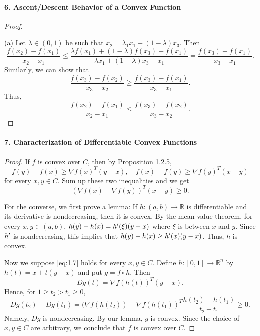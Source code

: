   \paragraph{6. Ascent/Descent Behavior of a Convex Function}
  \begin{proof}
    $\,$\par
    (a) Let $\lambda\in(0,1)$ be such that $x_2=\lambda_1x_1+(1-\lambda)x_3$.
    Then
    \[
      \frac{f(x_2)-f(x_1)}{x_2-x_1}
      \le\frac{\lambda f(x_1)+(1-\lambda)f(x_3)-f(x_1)}
         {\lambda x_1+(1-\lambda)x_3-x_1}
      =\frac{f(x_3)-f(x_1)}{x_3-x_1}.
    \]
    Similarly, we can show that
    \[
      \frac{f(x_3)-f(x_2)}{x_3-x_2}\ge\frac{f(x_3)-f(x_1)}{x_3-x_1}.
    \]
    Thus, 
    \[
      \frac{f(x_2)-f(x_1)}{x_2-x_1}\le\frac{f(x_3)-f(x_2)}{x_3-x_2}.
    \]
  \end{proof}
  
  \paragraph{7. Characterization of Differentiable Convex Functions}
  \begin{proof}
    If $f$ is convex over $C$, then by Proposition 1.2.5,
    \[
      f(y)-f(x)\ge\nabla f(x)^T(y-x),\quad
      f(x)-f(y)\ge\nabla f(y)^T(x-y)
    \]
    for every $x,y\in C$. Sum up these two inequalities and we get
    \begin{equation}
      \label{eq:1.7}
      (\nabla f(x)-\nabla f(y))^T(x-y)\ge 0.
    \end{equation}\par
    For the converse, we first prove a lemma: If $h:(a,b)\to\mathbb{R}$ is
    differentiable and its derivative is nondecreasing, then it is convex.
    By the mean value theorem, for every $x,y\in(a,b)$, $h(y)-h(x)=h^\prime(\xi)
    (y-x)$ where $\xi$ is between $x$ and $y$. Since $h^\prime$ is nondecreasing, 
    this implies that $h(y)-h(x)\ge h^\prime(x)(y-x)$. Thus, $h$ is convex.\par
    Now we suppose \eqref{eq:1.7} holds for every $x,y\in C$. Define $h:[0,1]
    \to\mathbb{R}^n$ by $h(t)=x+t(y-x)$ and put $g=f\circ h$. Then
    \[
      Dg(t)=\nabla f(h(t))^T(y-x).
    \]
    Hence, for $1\ge t_2>t_1\ge 0$,
    \[
      Dg(t_2)-Dg(t_1)=
      (\nabla f(h(t_2))-\nabla f(h(t_1))^T
      \frac{h(t_2)-h(t_1)}{t_2-t_1}\ge 0.
    \]
    Namely, $Dg$ is nondecreasing. By our lemma, $g$ is convex. Since the 
    choice of $x,y\in C$ are arbitrary, we conclude that $f$ is convex over 
    $C$.
  \end{proof}
  
